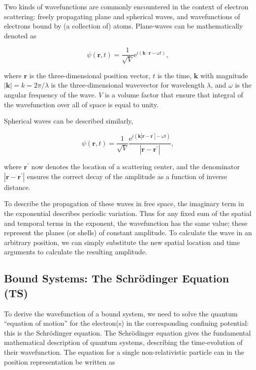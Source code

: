 \documentclass[%
 superscriptaddress,
 aip,
 amsmath,amssymb,
preprint,%
 author-year,%
longbibliography
]{revtex4-2}
\begin{document}
Two kinds of wavefunctions are commonly encountered in the context of electron scattering: freely propagating plane and spherical waves, and wavefunctions of electrons bound by (a collection of) atoms. Plane-waves can be mathematically denoted as

\begin{equation}
\psi(\bm{r}, t)=\frac{1}{\sqrt{V}} \mathrm{e}^{i\left(\bm{k} \cdot \bm{r}-\omega t\right)},
\end{equation}

where $\bm{r}$ is the three-dimensional position vector, $t$ is the time, $\bm{k}$ with magnitude $\left|\bm{k}\right|= k = 2 \pi/\lambda$ is the three-dimensional wavevector for wavelength $\lambda$, and $\omega$ is the angular frequency of the wave. $V$ is a volume factor that ensure that integral of the wavefunction over all of space is equal to unity.

Spherical waves can be described similarly,

\begin{equation}
\psi(\bm{r}, t)=\frac{1}{\sqrt{V}} \frac{\mathrm{e}^{i\left(\bm{k}\left|\bm{r}-\bm{r}^{\prime}\right|-\omega t\right)}}{\left|\bm{r}-\bm{r}^{\prime}\right|},
\end{equation}

where $\bm{r}^{\prime}$ now denotes the location of a scattering center, and the denominator $\left|\bm{r}-\bm{r}^{\prime}\right|$ ensures the correct decay of the amplitude as a function of inverse distance.

To describe the propagation of these waves in free space, the imaginary term in the exponential describes periodic variation. Thus for any fixed sum of the spatial and temporal terms in the exponent, the wavefunction has the same value; these represent the planes (or shells) of constant amplitude. To calculate the wave in an arbitrary position, we can simply substitute the new spatial location and time arguments to calculate the resulting amplitude.

\subsection*{Bound Systems: The Schr\"{o}dinger Equation (TS)}

To derive the wavefunction of a bound system, we need to solve the quantum ``equation of motion'' for the electron(s) in the corresponding confining potential: this is the Schr\"{o}dinger equation. The Schr\"{o}dinger equation gives the fundamental mathematical description of quantum systems, describing the time-evolution of their wavefunction. The equation for a single non-relativistic particle can in the position representation be written as
\end{document}
